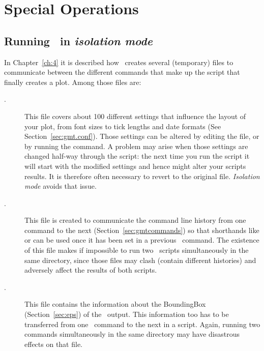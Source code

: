 %
%

\chapter{Special Operations}
\label{app:P}
\thispagestyle{headings}

\section{Running \gmt\ in \emph{isolation mode}}
\label{sec:isolationmode}
In Chapter~\ref{ch:4} it is described how \GMT\ creates several (temporary) files to
communicate between the different commands that make up the script that finally
creates a plot. Among those files are:
\begin{description}
\item[.] This file covers about 100 different settings
that influence the layout of your plot, from font sizes to tick lengths and
date formats (See Section~\ref{sec:gmt.conf}). Those settings can be altered
by editing the file, or by running the  command. A problem may
arise when those settings are changed half-way through the script: the next
time you run the script it will start with the modified settings and hence might
alter your scripts results. It is therefore often necessary to revert to the
original  file. \emph{Isolation mode} avoids that issue.
\item[.] This file is created to communicate the
command line history from one command to the next (Section~\ref{sec:gmtcommands})
so that shorthands like  or  can be used once it has been set in
a previous \GMT\ command.  The existence of this file makes if impossible to run
two \GMT\ scripts simultaneously in the same directory, since those 
files may clash (contain different histories) and adversely affect the results of both scripts.
\item[.] This file contains the information about the
BoundingBox (Section~\ref{sec:eps}) of the \PS\ output. This information too
has to be transferred from one \GMT\ command to the next in a script. Again,
running two commands simultaneously in the same directory may have disastrous effects on that file.
\end{description}

